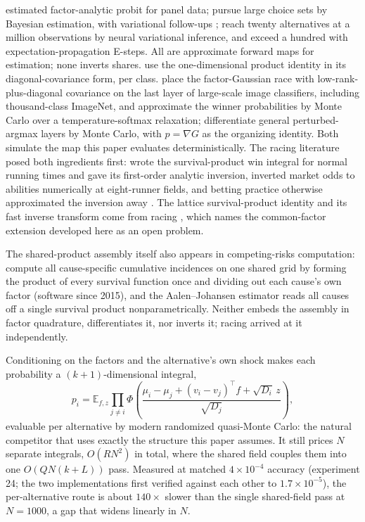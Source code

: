 \documentclass[12pt]{article}
\theoremstyle{remark}
\newcommand{\E}{\mathbb{E}}
\begin{document}
\citet{elrod1995}
estimated factor-analytic probit for panel data;
\citet{loaiza2022} pursue large choice sets by
Bayesian estimation, with variational follow-ups \citep{loaiza2023};
\citet{kim2026} reach twenty alternatives at a million observations by
neural variational inference, and \citet{ding2024} exceed a hundred with
expectation-propagation E-steps. All are approximate forward maps for
estimation; none inverts shares. \citet{girolami2006} use the
one-dimensional product identity in its diagonal-covariance form,
per class. \citet{collier2021} place the factor-Gaussian race with
low-rank-plus-diagonal covariance on the last layer of large-scale image
classifiers, including thousand-class ImageNet, and approximate the
winner probabilities by Monte Carlo over a temperature-softmax
relaxation; \citet{berthet2020} differentiate general perturbed-argmax
layers by Monte Carlo, with $p = \nabla G$ as the organizing identity.
Both simulate the map this paper evaluates deterministically. The racing literature posed both
ingredients first: \citet{henery1981} wrote the survival-product win
integral for normal running times and gave its first-order analytic
inversion, \citet{ali1998} inverted market odds to abilities numerically
at eight-runner fields, and betting practice otherwise approximated the
inversion away \citep{lo1994}. The lattice survival-product identity and
its fast inverse transform come from racing \citep{cotton2021}, which
names the common-factor extension developed here as an open problem.

The shared-product assembly itself also appears in competing-risks
computation: \citet{mahani2019} compute all cause-specific cumulative
incidences on one shared grid by forming the product of every survival
function once and dividing out each cause's own factor (software since
2015), and the Aalen--Johansen estimator \citep{aalen1978} reads all
causes off a single survival product nonparametrically. Neither embeds
the assembly in factor quadrature, differentiates it, nor inverts it;
racing arrived at it independently.

Conditioning on the factors and the alternative's own shock makes each
probability a $(k{+}1)$-dimensional integral,
\[
p_i = \E_{f,z} \prod_{j \ne i}
\Phi\!\left(\frac{\mu_i - \mu_j + (v_i - v_j)^\top f +
\sqrt{D_i}\,z}{\sqrt{D_j}}\right),
\]
evaluable per alternative by modern randomized quasi-Monte Carlo: the
natural competitor that uses exactly the structure this paper assumes. It
still prices $N$ separate integrals, $O(RN^2)$ in total, where the shared
field couples them into one $O(QN(k+L))$ pass. Measured at matched
$4\times10^{-4}$ accuracy (experiment 24; the two implementations first
verified against each other to $1.7\times10^{-5}$), the per-alternative
route is about $140\times$ slower than the single shared-field pass at
$N = 1000$, a gap that widens linearly in $N$.
\end{document}
